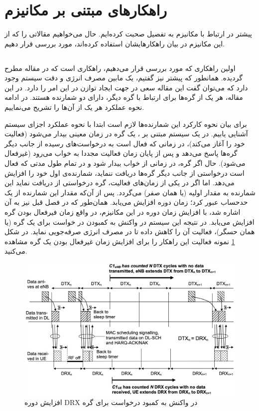 \section{راهکارهای مبتنی بر مکانیزم }
پیشتر در ارتباط با مکانیزم  به تفصیل صحبت کرده‌ایم. حال می‌خواهیم مقالاتی را که از این مکانیزم در بیان راهکارهایشان استفاده کرده‌اند، مورد بررسی قرار دهیم.

\subsection{}
اولین راهکاری که مورد بررسی قرار می‌دهیم، راهکاری است که در مقاله \cite{} مطرح گردیده. همانطور که پیشتر نیز گفتیم، یک  مابین مصرف انرژی و دقت سیستم وجود دارد که می‌توان گفت این مقاله سعی در جهت ایجاد توازن در این امر را دارد. در این مقاله، هر یک از گره‌ها برای ارتباط با گره دیگر، دارای دو شمارنده هستند. در ادامه نحوه عملکرد هر یک از آن‌ها را تشریح می‌نماییم.
\par
برای بیان نحوه کارکرد این شمارنده‌ها لازم است ابتدا با نحوه عملکرد اجزای سیستم آشنایی یابیم. در یک سیستم مبتنی بر ، یک گره در زمان معینی بیدار می‌شود (فعالیت خود را آغاز می‌کند)، در زمانی که فعال است به درخواست‌های رسیده از جانب دیگر گره‌ها پاسخ می‌دهد و پس از پایان زمان فعالیت مجددا به خواب می‌رود (غیرفعال می‌شود). حال اگر گره، در زمانی از خواب بیدار شود و در تمام طول مدتی که فعال است درخواستی از جانب دیگر گره‌ها دریافت ننماید، شمارنده‌ی اول خود را افزایش می‌دهد. اما اگر در یکی از زمان‌های فعالیت، گره درخواستی از دریافت نماید این شمارنده به مقدار اولیه (یا همان صفر)  می‌گردد. پس از آن‌که مقدار این شمارنده از یک حدحساب عبور کرد؛ زمان دوره  افزایش می‌یابد. همان‌طور که در فصل قبل نیز به آن اشاره شد، با افزایش زمان دوره در این مکانیزم، در واقع زمان فیرفعال بودن گره افزایش می‌یابد. در نتیجه این سیستم در واکنش به کمبودن در خواست برای یک گره (یا همان حسگر)، فعالیت آن را کاهش داده تا در مصرف انرژی صرفه‌جویی نماید. در شکل \ref{fig:cdd-extend} نمونه فعالیت این راهکار را برای افزایش زمان غیرفعال بودن یک گره مشاهده می‌کنید.

\begin{figure}
	\centering
	\includegraphics[width=0.7\linewidth]{figs/cdd-extend}
	\caption {افزایش دوره DRX در واکنش به کمبود درخواست برای گره}
	\label{fig:cdd-extend}
\end{figure}

